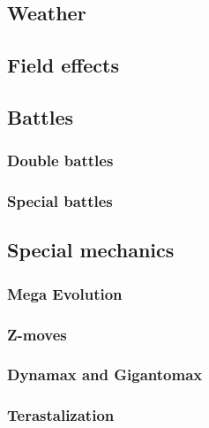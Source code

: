 \subsection{Weather}
\subsection{Field effects}
\subsection{Battles}
\subsubsection{Double battles}
\subsubsection{Special battles}
\subsection{Special mechanics}
\subsubsection{Mega Evolution}
\subsubsection{Z-moves}
\subsubsection{Dynamax and Gigantomax}
\subsubsection{Terastalization}
